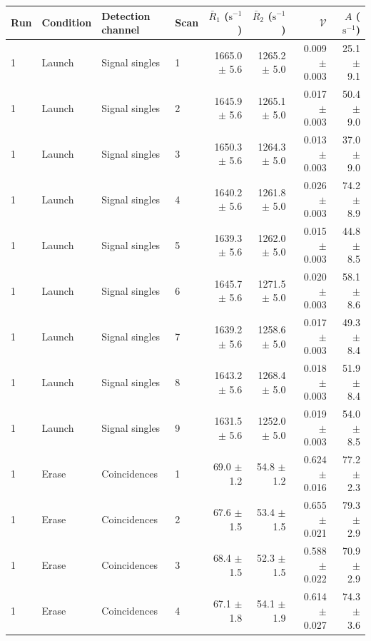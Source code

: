 \begin{tabular}{llllrrrr}
\toprule
Run & Condition & Detection channel & Scan & $\bar R_1$ ($\mathrm{s}^{-1}$) & $\bar R_2$ ($\mathrm{s}^{-1}$) & $\mathcal{V}$ & $A$ ($\mathrm{s}^{-1}$) \\
\midrule
1 & Launch & Signal singles & 1 & 1665.0 \ensuremath{\pm} 5.6 & 1265.2 \ensuremath{\pm} 5.0 & 0.009 \ensuremath{\pm} 0.003 & 25.1 \ensuremath{\pm} 9.1 \\
1 & Launch & Signal singles & 2 & 1645.9 \ensuremath{\pm} 5.6 & 1265.1 \ensuremath{\pm} 5.0 & 0.017 \ensuremath{\pm} 0.003 & 50.4 \ensuremath{\pm} 9.0 \\
1 & Launch & Signal singles & 3 & 1650.3 \ensuremath{\pm} 5.6 & 1264.3 \ensuremath{\pm} 5.0 & 0.013 \ensuremath{\pm} 0.003 & 37.0 \ensuremath{\pm} 9.0 \\
1 & Launch & Signal singles & 4 & 1640.2 \ensuremath{\pm} 5.6 & 1261.8 \ensuremath{\pm} 5.0 & 0.026 \ensuremath{\pm} 0.003 & 74.2 \ensuremath{\pm} 8.9 \\
1 & Launch & Signal singles & 5 & 1639.3 \ensuremath{\pm} 5.6 & 1262.0 \ensuremath{\pm} 5.0 & 0.015 \ensuremath{\pm} 0.003 & 44.8 \ensuremath{\pm} 8.5 \\
1 & Launch & Signal singles & 6 & 1645.7 \ensuremath{\pm} 5.6 & 1271.5 \ensuremath{\pm} 5.0 & 0.020 \ensuremath{\pm} 0.003 & 58.1 \ensuremath{\pm} 8.6 \\
1 & Launch & Signal singles & 7 & 1639.2 \ensuremath{\pm} 5.6 & 1258.6 \ensuremath{\pm} 5.0 & 0.017 \ensuremath{\pm} 0.003 & 49.3 \ensuremath{\pm} 8.4 \\
1 & Launch & Signal singles & 8 & 1643.2 \ensuremath{\pm} 5.6 & 1268.4 \ensuremath{\pm} 5.0 & 0.018 \ensuremath{\pm} 0.003 & 51.9 \ensuremath{\pm} 8.4 \\
1 & Launch & Signal singles & 9 & 1631.5 \ensuremath{\pm} 5.6 & 1252.0 \ensuremath{\pm} 5.0 & 0.019 \ensuremath{\pm} 0.003 & 54.0 \ensuremath{\pm} 8.5 \\
\midrule
1 & Erase & Coincidences & 1 & 69.0 \ensuremath{\pm} 1.2 & 54.8 \ensuremath{\pm} 1.2 & 0.624 \ensuremath{\pm} 0.016 & 77.2 \ensuremath{\pm} 2.3 \\
1 & Erase & Coincidences & 2 & 67.6 \ensuremath{\pm} 1.5 & 53.4 \ensuremath{\pm} 1.5 & 0.655 \ensuremath{\pm} 0.021 & 79.3 \ensuremath{\pm} 2.9 \\
1 & Erase & Coincidences & 3 & 68.4 \ensuremath{\pm} 1.5 & 52.3 \ensuremath{\pm} 1.5 & 0.588 \ensuremath{\pm} 0.022 & 70.9 \ensuremath{\pm} 2.9 \\
1 & Erase & Coincidences & 4 & 67.1 \ensuremath{\pm} 1.8 & 54.1 \ensuremath{\pm} 1.9 & 0.614 \ensuremath{\pm} 0.027 & 74.3 \ensuremath{\pm} 3.6 \\

\end{tabular}
